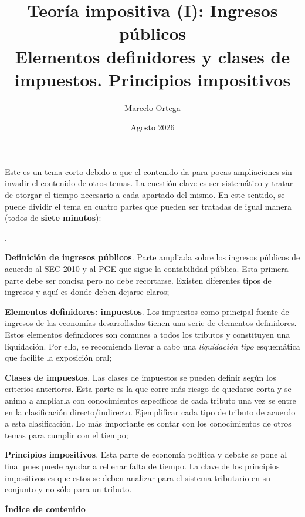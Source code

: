 \documentclass[10pt,a4paper]{article}
\title{Teoría impositiva (I): Ingresos públicos\\
\large Elementos definidores y clases de impuestos. Principios impositivos}
\author{Marcelo Ortega}
\date{Agosto 2026}
\makeatletter
\newcounter{numitem}
\newcommand{\puntosclave}[1]{%
  \begin{tcolorbox}[
    colframe=black,
    title={Puntos clave},
    before upper={\setlength{\parindent}{0.5cm}\setlength{\parskip}{0.5\baselineskip}}
  ]
  #1
  \end{tcolorbox}
}
\newcommand{\modificaciones}[1]{
  \begin{tcolorbox}[
    colback=white,
    colframe=red,
    title={Modificaciones a realizar},
    before upper={\setlength{\parindent}{0.5cm}\setlength{\parskip}{0.5\baselineskip}}
  ]
  #1
  \end{tcolorbox}
}
\newenvironment{lnum}
      {\begin{list}{\arabic{numitem}.}{%
          \usecounter{numitem}%
          \setlength{\leftmargin}{1cm}%
          \setlength{\parskip}{3pt}%
          \setlength{\itemsep}{0pt}%
          \setlength{\parsep}{0pt}%
      }}
      {\end{list}}
\newcommand{\MyTOC}{%
  \par\bigskip
  {\centering\bfseries\Large Índice de contenido\par}%
  \medskip
  \begingroup
    \parindent=0pt\parskip=2pt
    \@starttoc{stc}%
  \endgroup
}
\makeatother
\begin{document}
\maketitle
\newpage

\puntosclave{ %
     Este es un tema corto debido a que el contenido da para pocas ampliaciones sin invadir el contenido de otros temas. La cuestión clave es ser sistemático y tratar de otorgar el tiempo necesario a cada apartado del mismo. En este sentido, se puede dividir el tema en cuatro partes que pueden ser tratadas de igual manera (todos de \textbf{siete minutos}):
     \begin{lnum}
         \item \textbf{Definición de ingresos públicos}. Parte ampliada sobre los ingresos públicos de acuerdo al SEC 2010 y al PGE que sigue la contabilidad pública. Esta primera parte debe ser concisa pero no debe recortarse. Existen diferentes tipos de ingresos y aquí es donde deben dejarse claros;
         \item \textbf{Elementos definidores: impuestos}. Los impuestos como principal fuente de ingresos de las economías desarrolladas tienen una serie de elementos definidores. Estos elementos definidores son comunes a todos los tributos y constituyen una liquidación. Por ello, se recomienda llevar a cabo una \textit{liquidación tipo} esquemática que facilite la exposición oral;
         \item \textbf{Clases de impuestos}. Las clases de impuestos se pueden definir según los criterios anteriores. Esta parte es la que corre más riesgo de quedarse corta y se anima a ampliarla con conocimientos específicos de cada tributo una vez se entre en la clasificación directo/indirecto. Ejemplificar cada tipo de tributo de acuerdo a esta clasificación. Lo más importante es contar con los conocimientos de otros temas para cumplir con el tiempo;
         \item \textbf{Principios impositivos}. Esta parte de economía política y debate se pone al final pues puede ayudar a rellenar falta de tiempo. La clave de los principios impositivos es que estos se deben analizar para el sistema tributario en su conjunto y no sólo para un tributo.
     \end{lnum}
    }
\vspace{1cm}

\modificaciones{
    
    }

\newpage
\MyTOC
\newpage
\end{document}

